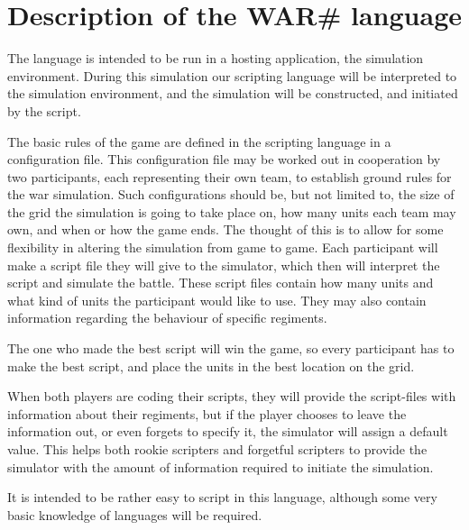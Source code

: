 
\section{ Description of the WAR\# language }

	The language is intended to be run in a hosting application, the simulation environment. During this simulation our scripting language will be interpreted to the simulation environment, and the simulation will be constructed, and initiated by the script.
	
	The basic rules of the game are defined in the scripting language in a configuration file. This configuration file may be worked out in cooperation by two participants, each representing their own team, to establish ground rules for the war simulation. Such configurations should be, but not limited to, the size of the grid the simulation is going to take place on, how many units each team may own, and when or how the game ends.
	The thought of this is to allow for some flexibility in altering the simulation from game to game.
	Each participant will make a script file they will give to the simulator, 
	which then will interpret the script and simulate the battle. 
	These script files contain how many units and what kind of units the participant would like to use. They may also contain information regarding the behaviour of specific regiments.

	The one who made the best script will win the game, so every participant has to make the best script, 
	and place the units in the best location on the grid.

When both players are coding their scripts, they will provide the script-files with information about their regiments, but if the player chooses to leave the information out, or even forgets to specify it, the simulator will assign a default value. This helps both rookie scripters and forgetful scripters to provide the simulator with the amount of information required to initiate the simulation.

It is intended to be rather easy to script in this language, although some very basic knowledge of languages will be required.


